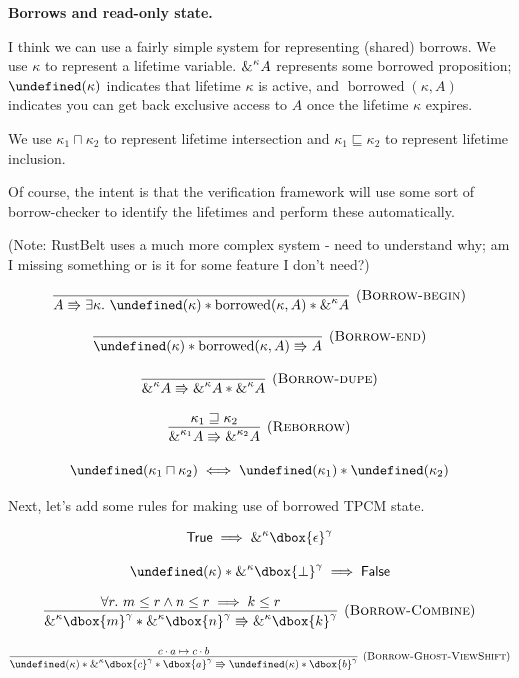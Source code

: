\documentclass{article}
\newcommand{\einfer}[3]
        {\infer[(\textsc{#1})]{#3}{#2}}
\newcommand\dboxed[1]{\dbox{\vphantom{t}\ensuremath{#1}}}
\newcommand{\viewshift}{\Rrightarrow}
\newcommand{\unit}{\epsilon}
\newcommand{\true}{\textsf{True}}
\newcommand{\false}{\textsf{False}}
\newcommand{\borrow}[2]{\textsc{\&}^{#1}#2}
\newcommand{\ltIntersect}{\sqcap}
\newcommand{\ltLe}{\sqsubseteq}
\newcommand{\ltGe}{\sqsupseteq}
\DeclareMathOperator{\borrowed}{borrowed}
\let\active\undefined
\DeclareMathOperator{\active}{active}
\begin{document}
\textbf{Borrows and read-only state.}

I think we can use a fairly simple system for representing (shared) borrows. 
We use $\kappa$ to represent a lifetime variable.
$\borrow{\kappa}{A}$ represents some borrowed proposition;
$\active(\kappa)$ indicates that lifetime $\kappa$ is active,
and $\borrowed(\kappa, A)$ indicates you can get back exclusive access to $A$
once the lifetime $\kappa$ expires.

We use $\kappa_1 \ltIntersect \kappa_2$ to represent lifetime intersection
and $\kappa_1 \ltLe \kappa_2$ to represent lifetime inclusion.

Of course, the intent is that the verification framework will use some sort of borrow-checker
to identify the lifetimes and perform these automatically.

(Note: RustBelt uses a much more complex system - need to understand why; am I missing something or is it for some feature I don't need?)

\[
  \einfer{Borrow-begin}{
  }{
    A \viewshift \exists
        \kappa .~ \active(\kappa) * \borrowed(\kappa, A) * \borrow{\kappa}{A}
  }
\]

\[
  \einfer{Borrow-end}{
  }{
    \active(\kappa) * \borrowed(\kappa, A) \viewshift A
  }
\]

\[
  \einfer{Borrow-dupe}{
  }{
    \borrow{\kappa}{A} \viewshift \borrow{\kappa}{A} * \borrow{\kappa}{A}
  }
\]

\[
  \einfer{Reborrow}{
    \kappa_1 \ltGe \kappa_2
  }{
    \borrow{\kappa_1}{A} \viewshift \borrow{\kappa_2}{A}
  }
\]

\[
  \active(\kappa_1 \ltIntersect \kappa_2) \iff \active(\kappa_1) * \active(\kappa_2)
\]

Next, let's add some rules for making use of borrowed TPCM state.

\[
  \true \implies \borrow{\kappa}{\dboxed{\unit}^\gamma}
\]

\[
  \active(\kappa) * \borrow{\kappa}{\dboxed{\bot}^\gamma} \implies \false
\]

\[
  \einfer{Borrow-Combine}{
    \forall r .~ m \le r \land n \le r \implies k \le r
  }{
    \borrow{\kappa}{\dboxed{m}^\gamma} * \borrow{\kappa}{\dboxed{n}^\gamma} \viewshift \borrow{\kappa}{\dboxed{k}^\gamma}
  }
\]

\[
  \einfer{Borrow-Ghost-ViewShift}{
    c \cdot a \mapsto c \cdot b
  }{
    \active(\kappa) * \borrow{\kappa}{\dboxed{c}^\gamma} * \dboxed{a}^\gamma
    \viewshift
    \active(\kappa) * \dboxed{b}^\gamma
  }
\]
\end{document}
